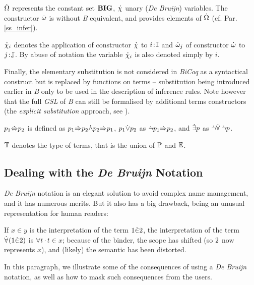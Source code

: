 \documentclass{llncs}
\begin{document}
$\dot{\Omega}$ represents the constant set $\mathbf{BIG}$, $\dot{\chi}_{}$ unary (\emph{De Bruijn}) 
variables. The constructor $\dot{\omega}_{}$ is without \emph{B} equivalent, and provides elements of 
$\dot{\Omega}$ (cf. Par. \ref{ss_infer}).

\begin{notation}\small$\dot{\chi}_{i}$ denotes the application of constructor $\dot{\chi}_{}$ to 
$i\!:\!\mathbb{I}$ and $\dot{\omega}_{j}$ of constructor $\dot{\omega}_{}$ to $j\!:\!\mathbb{J}$. By abuse of notation 
the variable $\dot{\chi}_{i}$ is also denoted simply by $i$.
\end{notation}

Finally, the elementary substitution is not considered in \emph{BiCoq} as a syntactical 
construct but is replaced by functions on terms -- substitution being introduced earlier in
\emph{B} only to be used in the description of inference rules. Note however that the full 
\emph{GSL} of \emph{B} can still be formalised by additional terms constructors (the 
\emph{explicit substitution} approach, see \cite{aba:1,cur:1}).

\begin{notation}\small$p_1\dot{\Leftrightarrow} p_2$ is defined as $p_1\dot{\Rightarrow} p_2 \dot{\land} p_2\dot{\Rightarrow} p_1$,
$p_1\dot{\lor} p_2$ as $\dot{\lnot} p_1 \dot{\Rightarrow} p_2$, and $\dot{\exists} p$ as $\dot{\lnot}\dot{\forall}\:\dot{\lnot} p$.
\end{notation}

\begin{notation}\small$\mathbb{T}$ denotes the type of terms, that is the union of $\mathbb{P}$ and 
$\mathbb{E}$.
\end{notation}

\subsection{Dealing with the \emph{De Bruijn} Notation}\label{ss_debruijn}

\emph{De Bruijn} notation is an elegant solution to avoid complex name management, and it has
numerous merits. But it also has a big drawback, being an unusual representation for human 
readers:
\begin{example}\label{ss_debruijn_ex1}
\small If $x\!\in\!y$ is the interpretation of the term $\text{1}\dot{\in}\text{2}$, the 
interpretation of the term $\dot{\forall}\:\!(\text{1}\dot{\in}\text{2})$ is $\forall t\!\cdot\!t\!\in\!x$; 
because of the binder, the scope has shifted (so $\text{2}$ now represents $x$), and (likely) 
the semantic has been distorted.
\end{example}
In this paragraph, we illustrate some of the consequences of using a \emph{De Bruijn} notation,
as well as how to mask such consequences from the users.
\end{document}

